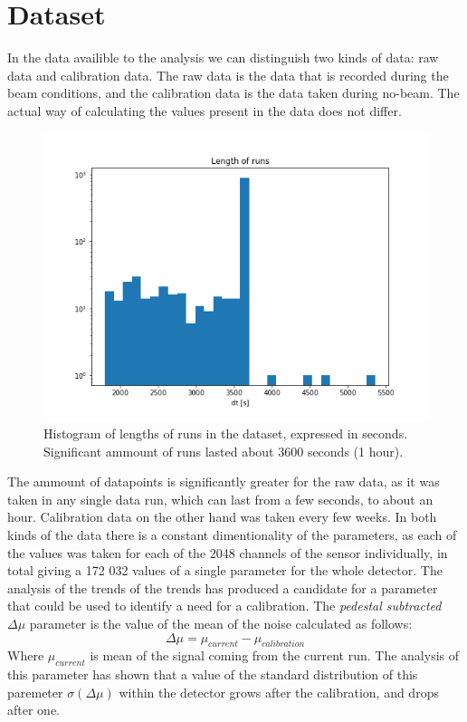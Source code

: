 \section{Dataset}
In the data availible to the analysis we can distinguish two kinds of data: raw data and calibration data.
The raw data is the data that is recorded during the beam conditions, and the calibration data is the data taken during no-beam.
The actual way of calculating the values present in the data does not differ.
\begin{figure}
    \centering
    \includegraphics[width=0.6\linewidth]{figures/chapter4/wtte/runlengths.png}
    \caption{Histogram of lengths of runs in the dataset, expressed in seconds. Significant ammount of runs lasted about 3600 seconds (1 hour).}
    \label{plot:runlen}
  \end{figure}
The ammount of datapoints is significantly greater for the raw data, as it was taken in any single data run, which can last from a few seconds, to about an hour.
Calibration data on the other hand was taken every few weeks.
In both kinds of the data there is a constant dimentionality of the parameters, as each of the values was taken for each of the 2048 channels of the sensor individually, in total giving a 172 032 values of a single parameter for the whole detector.
The analysis of the trends of the trends has produced a candidate for a parameter that could be used to identify a need for a calibration.
The \textit{pedestal subtracted} $\Delta\mu$  parameter is the value of the mean of the noise calculated as follows:
\begin{equation}
    \Delta\mu = \mu_{current} - \mu_{calibration}
\end{equation}
Where $\mu_{current}$ is mean of the signal coming from the current run.
The analysis of this parameter has shown that a value of the standard distribution of this paremeter $\sigma(\Delta\mu)$ within the detector grows after the calibration, and drops after one.
